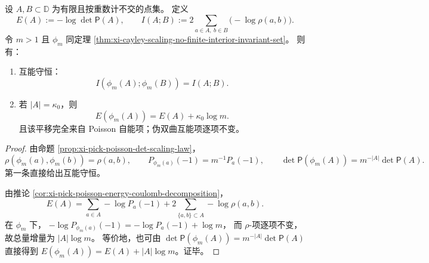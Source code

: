 \begin{theorem}\label{thm:xi-scaling-mutual-energy-conservation-selfenergy-dissipation}
设 \(A,B\subset\mathbb D\) 为有限且按重数计不交的点集。
定义
\[
E(A):=-\log\det\mathsf P(A),\qquad
I(A;B):=2\sum_{a\in A,\ b\in B}\bigl(-\log\rho(a,b)\bigr).
\]
令 \(m>1\) 且 \(\phi_m\) 同定理 \ref{thm:xi-cayley-scaling-no-finite-interior-invariant-set}。
则有：
\begin{enumerate}
  \item 互能守恒：
  \[
  I(\phi_m(A);\phi_m(B))=I(A;B).
  \]
  \item 若 \(|A|=\kappa_0\)，则
  \[
  E(\phi_m(A))=E(A)+\kappa_0\log m.
  \]
  且该平移完全来自 Poisson 自能项；伪双曲互能项逐项不变。
\end{enumerate}
\end{theorem}
\begin{proof}
由命题 \ref{prop:xi-pick-poisson-det-scaling-law}，
\[
\rho(\phi_m(a),\phi_m(b))=\rho(a,b),\qquad
P_{\phi_m(a)}(-1)=m^{-1}P_a(-1),\qquad
\det\mathsf P(\phi_m(A))=m^{-|A|}\det\mathsf P(A).
\]
第一条直接给出互能守恒。
\par
由推论 \ref{cor:xi-pick-poisson-energy-coulomb-decomposition}，
\[
E(A)=\sum_{a\in A}-\log P_a(-1)
+2\sum_{\{a,b\}\subset A}-\log\rho(a,b).
\]
在 \(\phi_m\) 下，
\(
-\log P_{\phi_m(a)}(-1)=-\log P_a(-1)+\log m
\)，
而 \(\rho\)-项逐项不变，故总量增量为 \(|A|\log m\)。
等价地，也可由
\(
\det\mathsf P(\phi_m(A))=m^{-|A|}\det\mathsf P(A)
\)
直接得到 \(E(\phi_m(A))=E(A)+|A|\log m\)。证毕。
\end{proof}

